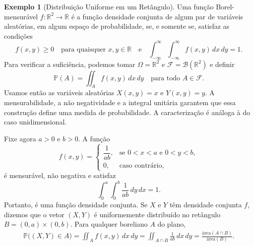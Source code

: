 \documentclass[12pt,portuguese]{article}
\theoremstyle{definition}
\newtheorem{example}[example]{Exemplo}
\theoremstyle{plainexercise}
\theoremstyle{starredexercise}
\theoremstyle{definition}
\begin{document}
\begin{example}[Distribuição Uniforme em um Retângulo]\label{ex:distribuicao-uniforme-retangulo}
  Uma função Borel-mensurável $f : \mathbb{R}^2 \to \mathbb{R}$
  é a função densidade conjunta de algum par de variáveis aleatórias,
  em algum espaço de probabilidade, se, e somente se, satisfaz as condições
  \[
    f(x, y) \geqslant 0 \quad \text{para quaisquer } x, y \in \mathbb{R}
    \quad \text{e} \quad
    \int_{-\infty}^{\infty} \int_{-\infty}^{\infty} f(x, y)\,dx\,dy = 1.
  \]
  Para verificar a suficiência, podemos tomar $\Omega = \mathbb{R}^2$ e
  $\mathcal{F} = \mathscr{B}(\mathbb{R}^2)$ e definir
  \[
    \mathbb{P}(A) = \iint_A f(x,y)\,dx\,dy
    \quad \text{para todo } A \in \mathcal{F}.
  \]
  Usamos então as variáveis aleatórias $X(x,y) = x$ e $Y(x,y) = y$.
  A mensurabilidade, a não negatividade e a
  integral unitária garantem que essa construção define uma medida de
  probabilidade. A caracterização é análoga à do caso unidimensional.

  Fixe agora $a > 0$ e $b > 0$. A função
  \[
    f(x, y) =
    \begin{cases}
      \dfrac{1}{ab}, & \text{se } 0 < x < a \text{ e } 0 < y < b, \\[0.3cm]
      0, & \text{caso contrário},
    \end{cases}
  \]
  é mensurável, não negativa e satisfaz
  \[
    \int_0^a \int_0^b \frac{1}{ab}\,dy\,dx = 1.
  \]
  Portanto, é uma função densidade conjunta. Se $X$ e $Y$ têm densidade
  conjunta $f$, dizemos que o vetor $(X, Y)$ é uniformemente distribuído no retângulo
  $B = (0, a) \times (0, b)$. Para qualquer boreliano $A$ do plano,
  \begin{align*}
    \mathbb{P}\bigl((X, Y) \in A\bigr)
    = \iint_A f(x, y)\,dx\,dy
    = \iint_{A \cap B} \frac{1}{ab}\,dx\,dy
    = \frac{\text{área}(A \cap B)}{\text{área}(B)}.
  \end{align*}
\end{example}
\end{document}
